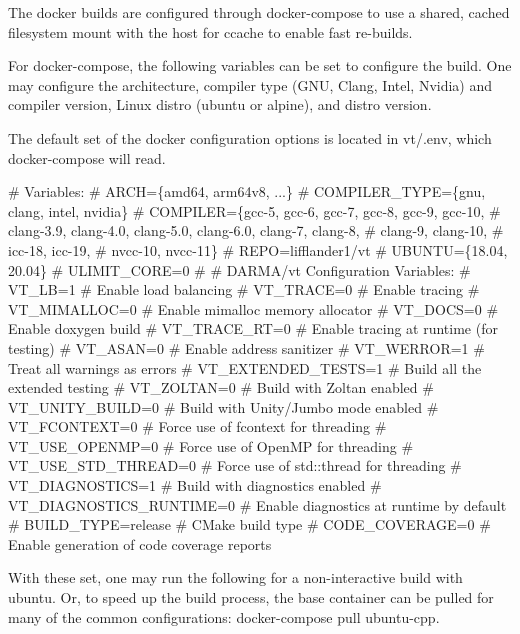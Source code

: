 The {\ttfamily docker} builds are configured through {\ttfamily docker-\/compose} to use a shared, cached filesystem mount with the host for {\ttfamily ccache} to enable fast re-\/builds.

For {\ttfamily docker-\/compose}, the following variables can be set to configure the build. One may configure the architecture, compiler type (G\+NU, Clang, Intel, Nvidia) and compiler version, Linux distro (ubuntu or alpine), and distro version.

The default set of the docker configuration options is located in {\ttfamily vt/.env}, which {\ttfamily docker-\/compose} will read.


\begin{DoxyCode}
# Variables:
#   ARCH=\{amd64, arm64v8, ...\}
#   COMPILER\_TYPE=\{gnu, clang, intel, nvidia\}
#   COMPILER=\{gcc-5, gcc-6, gcc-7, gcc-8, gcc-9, gcc-10,
#             clang-3.9, clang-4.0, clang-5.0, clang-6.0, clang-7, clang-8,
#             clang-9, clang-10,
#             icc-18, icc-19,
#             nvcc-10, nvcc-11\}
#   REPO=lifflander1/vt
#   UBUNTU=\{18.04, 20.04\}
#   ULIMIT\_CORE=0
#
# DARMA/vt Configuration Variables:
#   VT\_LB=1                   # Enable load balancing
#   VT\_TRACE=0                # Enable tracing
#   VT\_MIMALLOC=0             # Enable mimalloc memory allocator
#   VT\_DOCS=0                 # Enable doxygen build
#   VT\_TRACE\_RT=0             # Enable tracing at runtime (for testing)
#   VT\_ASAN=0                 # Enable address sanitizer
#   VT\_WERROR=1               # Treat all warnings as errors
#   VT\_EXTENDED\_TESTS=1       # Build all the extended testing
#   VT\_ZOLTAN=0               # Build with Zoltan enabled
#   VT\_UNITY\_BUILD=0          # Build with Unity/Jumbo mode enabled
#   VT\_FCONTEXT=0             # Force use of fcontext for threading
#   VT\_USE\_OPENMP=0           # Force use of OpenMP for threading
#   VT\_USE\_STD\_THREAD=0       # Force use of std::thread for threading
#   VT\_DIAGNOSTICS=1          # Build with diagnostics enabled
#   VT\_DIAGNOSTICS\_RUNTIME=0  # Enable diagnostics at runtime by default
#   BUILD\_TYPE=release        # CMake build type
#   CODE\_COVERAGE=0           # Enable generation of code coverage reports
\end{DoxyCode}


With these set, one may run the following for a non-\/interactive build with ubuntu. Or, to speed up the build process, the base container can be pulled for many of the common configurations\+: {\ttfamily docker-\/compose pull ubuntu-\/cpp}.


